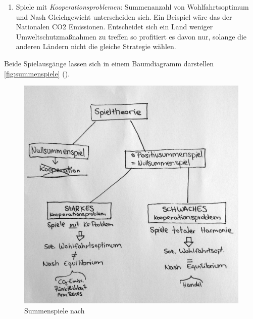 {\begin{enumerate}
			\begin{quote}
				``Wer sein eigenes Interesse verfolgt, befördert das Wohl der Gesamtgesellschaft häufig wirkungsvoller, als wenn er wirklich beabsichtigt, es zu fördern. Ich habe nie erlebt, dass viel Gutes von denen erreicht wurde, die vorgaben, für das öffentliche Wohl zu handeln.'' \emph{Adam Smith ``Wealth of Nations''}
			\end{quote}

		\item Spiele mit \emph{Kooperationsproblemen}: Summenanzahl von Wohlfahrtsoptimum und Nash Gleichgewicht unterscheiden sich.
		Ein Beispiel wäre das der Nationalen CO2 Emissionen. Entscheidet sich ein Land weniger Umweltschutzmaßnahmen zu treffen so profitiert es davon nur, solange die anderen Ländern nicht die gleiche Strategie wählen.

\end{enumerate}

Beide Spielausgänge lassen sich in einem Baumdiagramm darstellen \autoref{fig:summenspiele} ().

\begin{figure}[htbp]
	\begin{center}
	\includegraphics[width=1\textwidth]{img/summenspiele.jpg}
	\caption{Summenspiele nach \cite{Kleinberg-2009-oz}}
	\label{fig:gefangenendilemma}
	\end{center}
\end{figure}


}
